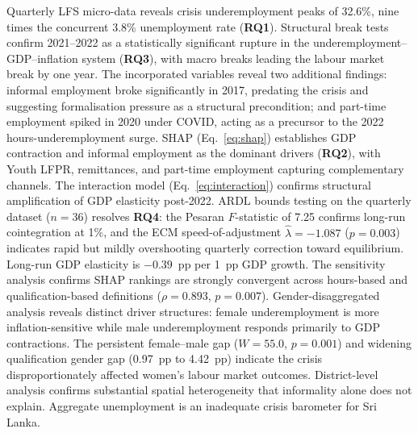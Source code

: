 \documentclass[sigconf]{acmart}
\begin{document}
Quarterly LFS micro-data reveals crisis underemployment peaks of 32.6\%,
nine times the concurrent 3.8\% unemployment rate (\textbf{RQ1}). Structural break tests
confirm 2021--2022 as a statistically significant rupture in the
underemployment--GDP--inflation system (\textbf{RQ3}), with macro breaks leading the labour
market break by one year. The incorporated variables reveal two additional
findings: informal employment broke significantly in 2017, predating the
crisis and suggesting formalisation pressure as a structural precondition;
and part-time employment spiked in 2020 under COVID, acting as a precursor
to the 2022 hours-underemployment surge. SHAP (Eq.~\ref{eq:shap})
establishes GDP contraction and informal employment as the dominant drivers (\textbf{RQ2}),
with Youth LFPR, remittances, and part-time employment capturing
complementary channels. The interaction model (Eq.~\ref{eq:interaction})
confirms structural amplification of GDP elasticity post-2022. ARDL bounds
testing on the quarterly dataset ($n{=}36$) resolves \textbf{RQ4}: the
Pesaran $F$-statistic of 7.25 confirms long-run cointegration at 1\%,
and the ECM speed-of-adjustment $\hat\lambda{=}{-}1.087$ ($p{=}0.003$)
indicates rapid but mildly overshooting quarterly correction toward equilibrium. Long-run
GDP elasticity is $-0.39$~pp per 1~pp GDP growth. The sensitivity analysis
confirms SHAP rankings are strongly convergent across
hours-based and qualification-based definitions ($\rho = 0.893$,
$p = 0.007$). Gender-disaggregated analysis reveals distinct driver
structures: female underemployment is more inflation-sensitive while male
underemployment responds primarily to GDP contractions. The persistent
female--male gap ($W = 55.0$, $p = 0.001$) and widening qualification
gender gap (0.97~pp to 4.42~pp) indicate the crisis disproportionately
affected women's labour market outcomes. District-level analysis confirms
substantial spatial heterogeneity that informality alone does not explain.
Aggregate unemployment is an inadequate crisis barometer for Sri Lanka.
\end{document}
